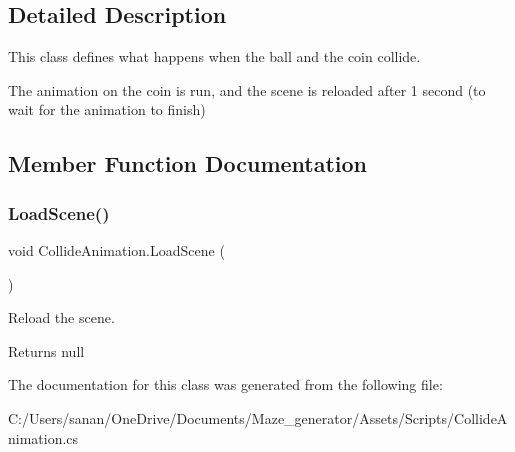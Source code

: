 \subsection{Detailed Description}
This class defines what happens when the ball and the coin collide. 

The animation on the coin is run, and the scene is reloaded after 1 second (to wait for the animation to finish) 

\subsection{Member Function Documentation}
\mbox{\label{class_collide_animation_afc39a27ba15b21702c2ba2d9a20faae8}} 
\subsubsection{\texorpdfstring{LoadScene()}{LoadScene()}}
{\footnotesize\ttfamily void Collide\+Animation.\+Load\+Scene (\begin{DoxyParamCaption}{ }\end{DoxyParamCaption})\hspace{0.3cm}{\ttfamily [private]}}



Reload the scene. 

\begin{DoxyReturn}{Returns}
null 
\end{DoxyReturn}


The documentation for this class was generated from the following file\+:\begin{DoxyCompactItemize}
\item 
C\+:/\+Users/sanan/\+One\+Drive/\+Documents/\+Maze\+\_\+generator/\+Assets/\+Scripts/Collide\+Animation.\+cs\end{DoxyCompactItemize}
